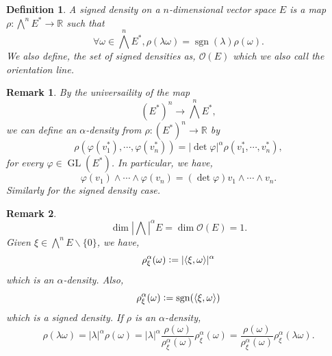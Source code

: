 \documentclass[8pt]{article}
\newtheorem{definition}{Definition}[section]
\newtheorem{remark}{Remark}[section]
\DeclareMathOperator{\GL}{GL}
\DeclareMathOperator{\sgn}{sgn}
\newcommand{\defeq}{\vcentcolon=}
\newcommand{\R}[0]{\mathbb{R}}
\begin{document}
\begin{definition}
  A signed density on a $n$-dimensional vector space $E$ is a map $\rho:\bigwedge^n E^*\to\R$ such that 
  \begin{equation*}
    \forall \omega\in\bigwedge^nE^*, \rho(\lambda\omega)= \sgn(\lambda)\rho(\omega).
  \end{equation*}
  We also define, the set of signed densities as,
    $\mathcal{O}(E)$ which we also call the orientation line.
\end{definition}

\begin{remark}
  By the universaility of the map
\begin{equation*}
  (E^*)^n\to\bigwedge^n E^*,
\end{equation*}
we can define an $\alpha$-density from $\rho:(E^*)^n\to \R$ by
\begin{equation*}
  \rho(\varphi(v_1^*),\cdots,\varphi(v_n^*)) = \vert\det\varphi\vert^\alpha\rho(v_1^*,\cdots,v_n^*),
\end{equation*}
for every $\varphi\in\GL(E^*)$. In particular, we have,
\begin{equation*}
  \varphi(v_1)\wedge\cdots\wedge\varphi(v_n) = (\det\varphi) v_1\wedge\cdots\wedge v_n.
\end{equation*}
Similarly for the signed density case.%
\end{remark}

\begin{remark}
  \begin{equation*}
    \dim\left\vert\bigwedge\right\vert^\alpha E = \dim \mathcal{O}(E) = 1.
  \end{equation*}
  Given $\xi\in\bigwedge^nE\backslash\{0\}$, we have,
  \begin{equation*}
    \rho_\xi^\alpha(\omega) \defeq \vert\langle\xi,\omega\rangle\vert^\alpha
  \end{equation*}
  which is an $\alpha$-density. Also,
  \begin{equation*}
    \rho_\xi^\alpha(\omega)\defeq \sgn(\langle\xi,\omega\rangle)
  \end{equation*}
  which is a signed density. If $\rho$ is an $\alpha$-density,
  \begin{equation*}
    \rho(\lambda\omega) = \vert\lambda\vert^\alpha\rho(\omega) = \vert\lambda\vert^\alpha{\frac {\rho(\omega)} {\rho^\alpha_\xi(\omega)}}\rho^\alpha_\xi(\omega) = {\frac {\rho(\omega)} {\rho_\xi^\alpha(\omega)}}\rho_\xi^\alpha(\lambda\omega).
  \end{equation*}
\end{remark}
\end{document}
